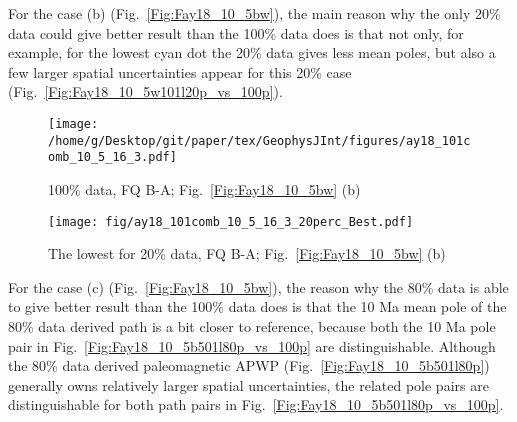 For the case (b) (Fig.~\ref{Fig:Fay18_10_5bw}), the main reason why the only
20\% data could give better result than the 100\% data does is that not only,
for example, for the lowest cyan dot the 20\% data gives less mean poles, but
also a few larger spatial uncertainties appear for this 20\% case
(Fig.~\ref{Fig:Fay18_10_5w101l20p_vs_100p}).

\begin{figure*}[tbp]
  \captionsetup[subfigure]{labelformat=empty,aboveskip=-6pt,belowskip=-6pt}
  \centering
  \begin{subfigure}[htbp]{.49\textwidth}
    \captionsetup{skip=0pt}
    \centering
    \texttt{[image: /home/g/Desktop/git/paper/tex/GeophysJInt/figures/ay18\_101comb\_10\_5\_16\_3.pdf]}
	\caption{100\% data, FQ B-A; Fig.~\ref{Fig:Fay18_10_5bw}
	(b)}\label{Fig:Fay18_10_5w101}
  \end{subfigure}
  \begin{subfigure}[htbp]{.49\textwidth}
    \captionsetup{skip=0pt}
    \centering
    \texttt{[image: fig/ay18\_101comb\_10\_5\_16\_3\_20perc\_Best.pdf]}  %
    \caption{The lowest for 20\% data, FQ B-A;
	Fig.~\ref{Fig:Fay18_10_5bw} (b)}\label{Fig:Fay18_10_5w101l20p}
  \end{subfigure}
  \caption[Less data, better similarity?]{Comparing the 100\% North American
  120 Ma paleomagnetic data derived result with the best of the only
  20\% data (giving even better similarity) derived results (the green dot in
  Fig.~\ref{Fig:Fay18_10_5bw} (b)).}\label{Fig:Fay18_10_5w101l20p_vs_100p}
\end{figure*}

For the case (c) (Fig.~\ref{Fig:Fay18_10_5bw}), the reason why the 80\% data is
able to give better result than the 100\% data does is that the 10 Ma mean pole
of the 80\% data derived path is a bit closer to reference, because both the 10
Ma pole pair in Fig.~\ref{Fig:Fay18_10_5b501l80p_vs_100p} are distinguishable.
Although the 80\% data derived paleomagnetic APWP
(Fig.~\ref{Fig:Fay18_10_5b501l80p}) generally owns relatively larger spatial
uncertainties, the related pole pairs are distinguishable for both path pairs in
Fig.~\ref{Fig:Fay18_10_5b501l80p_vs_100p}.

